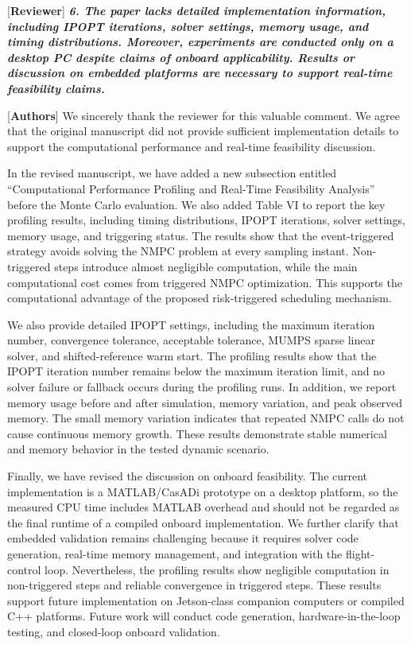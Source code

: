 \documentclass[12pt, twosides]{article}
\theoremstyle{definition}
\begin{document}
\textcolor[rgb]{0.00,0.00,1.00}{[\textbf{Reviewer}]} 
\textit{\textbf{6. The paper lacks detailed implementation information, including IPOPT iterations, solver settings, memory usage, and timing distributions. Moreover, experiments are conducted only on a desktop PC despite claims of onboard applicability. Results or discussion on embedded platforms are necessary to support real-time feasibility claims.}}

\textcolor[rgb]{0.00,0.00,1.00}{[\textbf{Authors}]} 
We sincerely thank the reviewer for this valuable comment. We agree that the original manuscript did not provide sufficient implementation details to support the computational performance and real-time feasibility discussion.

In the revised manuscript, we have added a new subsection entitled ``Computational Performance Profiling and Real-Time Feasibility Analysis'' before the Monte Carlo evaluation. We also added Table VI to report the key profiling results, including timing distributions, IPOPT iterations, solver settings, memory usage, and triggering status. The results show that the event-triggered strategy avoids solving the NMPC problem at every sampling instant. Non-triggered steps introduce almost negligible computation, while the main computational cost comes from triggered NMPC optimization. This supports the computational advantage of the proposed risk-triggered scheduling mechanism.

We also provide detailed IPOPT settings, including the maximum iteration number, convergence tolerance, acceptable tolerance, MUMPS sparse linear solver, and shifted-reference warm start. The profiling results show that the IPOPT iteration number remains below the maximum iteration limit, and no solver failure or fallback occurs during the profiling runs. In addition, we report memory usage before and after simulation, memory variation, and peak observed memory. The small memory variation indicates that repeated NMPC calls do not cause continuous memory growth. These results demonstrate stable numerical and memory behavior in the tested dynamic scenario.

Finally, we have revised the discussion on onboard feasibility. The current implementation is a MATLAB/CasADi prototype on a desktop platform, so the measured CPU time includes MATLAB overhead and should not be regarded as the final runtime of a compiled onboard implementation. We further clarify that embedded validation remains challenging because it requires solver code generation, real-time memory management, and integration with the flight-control loop. Nevertheless, the profiling results show negligible computation in non-triggered steps and reliable convergence in triggered steps. These results support future implementation on Jetson-class companion computers or compiled C++ platforms. Future work will conduct code generation, hardware-in-the-loop testing, and closed-loop onboard validation.
\end{document}
